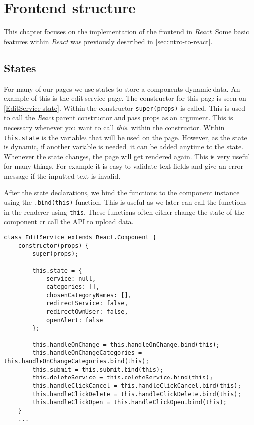 \section{Frontend structure}
This chapter focuses on the implementation of the frontend in \textit{React}.
Some basic features within \textit{React} was previously described in \autoref{sec:intro-to-react}.


\subsection{States}
For many of our pages we use states to store a components dynamic data. 
An example of this is the edit service page. 
The constructor for this page is seen on \autoref{EditService-state}.
Within the constructor \texttt{super(props)} is called. 
This is used to call the \textit{React} parent constructor and pass props as an argument.
This is necessary whenever you want to call \textit{this.} within the constructor.
Within \texttt{this.state} is the variables that will be used on the page. 
However, as the state is dynamic, if another variable is needed, it can be added anytime to the state.
Whenever the state changes, the page will get rendered again. 
This is very useful for many things. 
For example it is easy to validate text fields and give an error message if the inputted text is invalid.  

After the state declarations, we bind the functions to the component instance using the \texttt{.bind(this)} function.
This is useful as we later can call the functions in the renderer using \texttt{this}.
These functions often either change the state of the component or call the API to upload data.
\begin{lstlisting}[caption={Constructor and state for edit service}, captionpos=b, label={EditService-state}]
class EditService extends React.Component {
    constructor(props) {
        super(props);
    
        this.state = {
            service: null,
            categories: [],
            chosenCategoryNames: [],
            redirectService: false,
            redirectOwnUser: false,
            openAlert: false
        };
            
        this.handleOnChange = this.handleOnChange.bind(this);
        this.handleOnChangeCategories = this.handleOnChangeCategories.bind(this);
        this.submit = this.submit.bind(this);
        this.deleteService = this.deleteService.bind(this);
        this.handleClickCancel = this.handleClickCancel.bind(this);
        this.handleClickDelete = this.handleClickDelete.bind(this);
        this.handleClickOpen = this.handleClickOpen.bind(this);
    }
    ...
\end{lstlisting}

